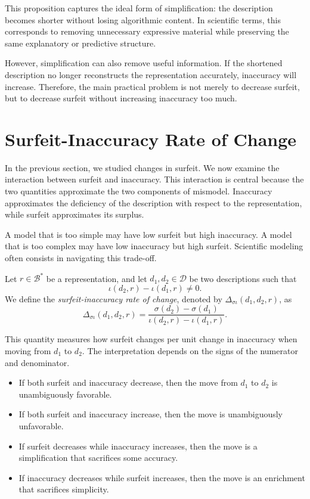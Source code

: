 This proposition captures the ideal form of simplification: the description becomes shorter without losing algorithmic content. In scientific terms, this corresponds to removing unnecessary expressive material while preserving the same explanatory or predictive structure.

However, simplification can also remove useful information. If the shortened description no longer reconstructs the representation accurately, inaccuracy will increase. Therefore, the main practical problem is not merely to decrease surfeit, but to decrease surfeit without increasing inaccuracy too much.

%
%

\section{Surfeit-Inaccuracy Rate of Change}
\label{Surfeit_inaccuracy_rate_of_Change}

In the previous section, we studied changes in surfeit. We now examine the interaction between surfeit and inaccuracy. This interaction is central because the two quantities approximate the two components of mismodel. Inaccuracy approximates the deficiency of the description with respect to the representation, while surfeit approximates its surplus.

A model that is too simple may have low surfeit but high inaccuracy. A model that is too complex may have low inaccuracy but high surfeit. Scientific modeling often consists in navigating this trade-off.

\begin{definition}
Let \(r\in\mathcal B^\ast\) be a representation, and let \(d_1,d_2\in\mathcal D\) be two descriptions such that
\[
\iota(d_2,r)-\iota(d_1,r)\neq 0.
\]
We define the \emph{surfeit-inaccuracy rate of change}, denoted by \(\Delta_{\sigma\iota}(d_1,d_2,r)\), as
\[
\Delta_{\sigma\iota}(d_1,d_2,r)
=
\frac{\sigma(d_2)-\sigma(d_1)}
{\iota(d_2,r)-\iota(d_1,r)}.
\]
\end{definition}

This quantity measures how surfeit changes per unit change in inaccuracy when moving from \(d_1\) to \(d_2\). The interpretation depends on the signs of the numerator and denominator.

\begin{itemize}
    \item If both surfeit and inaccuracy decrease, then the move from \(d_1\) to \(d_2\) is unambiguously favorable.
    \item If both surfeit and inaccuracy increase, then the move is unambiguously unfavorable.
    \item If surfeit decreases while inaccuracy increases, then the move is a simplification that sacrifices some accuracy.
    \item If inaccuracy decreases while surfeit increases, then the move is an enrichment that sacrifices simplicity.
\end{itemize}

